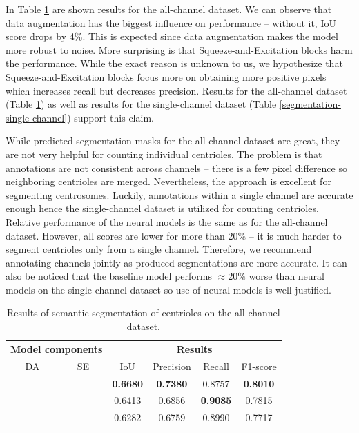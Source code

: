 \documentclass[9pt,conference,compsocconf, article]{IEEEtran}
\newcommand{\cmark}{\ding{51}}
\newcommand{\xmark}{\ding{55}}
\begin{document}
In Table \ref{segmentation-all-channel} are shown results for the all-channel dataset. We can observe that data augmentation has the biggest influence on performance -- without it, IoU score drops by 4\%. This is expected since data augmentation makes the model more robust to noise. More surprising is that Squeeze-and-Excitation blocks harm the performance. While the exact reason is unknown to us, we hypothesize that Squeeze-and-Excitation blocks focus more on obtaining more positive pixels which increases recall but decreases precision. Results for the all-channel dataset (Table \ref{segmentation-all-channel}) as well as results for the single-channel dataset (Table \ref{segmentation-single-channel}) support this claim.

While predicted segmentation masks for the all-channel dataset are great, they are not very helpful for counting individual centrioles. The problem is that annotations are not consistent across channels -- there is a few pixel difference so neighboring centrioles are merged. Nevertheless, the approach is excellent for segmenting centrosomes. Luckily, annotations within a single channel are accurate enough hence the single-channel dataset is utilized for counting centrioles. Relative performance of the neural models is the same as for the all-channel dataset. However, all scores are lower for more than $20\%$ -- it is much harder to segment centrioles only from a single channel. Therefore, we recommend annotating channels jointly as produced segmentations are more accurate. It can also be noticed that the baseline model performs $\approx 20\%$ worse than neural models on the single-channel dataset so use of neural models is well justified.


\begin{table}[h!]
  \caption{Results of semantic segmentation of centrioles on the all-channel dataset.}
  \label{segmentation-all-channel}
  \centering

  \begin{tabular}{cccccc}
    \toprule
    \multicolumn{2}{c}{\textbf{Model components}} & \multicolumn{4}{c}{\textbf{Results}}  \\
    DA & SE & IoU & Precision & Recall & F1-score \\
    \midrule
    \cmark & \xmark & \textbf{0.6680} & \textbf{0.7380} & 0.8757 & \textbf{0.8010} \\
    \cmark & \cmark & 0.6413 & 0.6856 & \textbf{0.9085} & 0.7815 \\
    \xmark & \cmark & 0.6282 & 0.6759 & 0.8990 & 0.7717 \\    \bottomrule
  \end{tabular}
\end{table}
\end{document}

